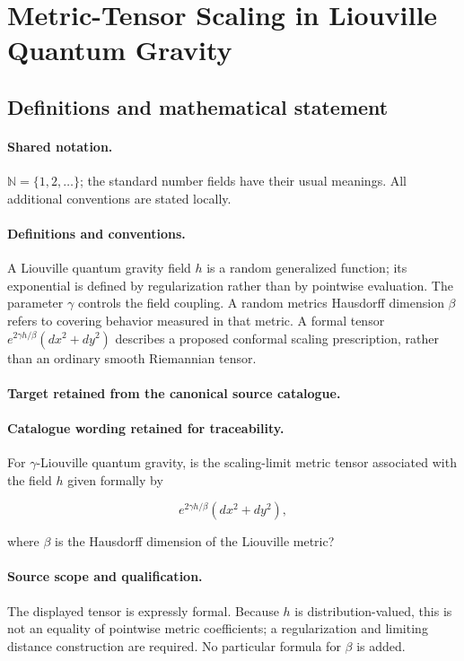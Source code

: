 \documentclass[11pt]{article}
\begin{document}
\section{Metric-Tensor Scaling in Liouville Quantum Gravity}\label{statement}

\subsection{Definitions and mathematical statement}

\paragraph{Shared notation.}$\mathbb N=\{1,2,\ldots\}$; the standard number fields have their usual meanings. All additional conventions are stated locally.


\paragraph{Definitions and conventions.}
A Liouville quantum gravity field $h$ is a random generalized function; its exponential is defined by regularization rather than by pointwise evaluation. The parameter $\gamma$ controls the field coupling. A random metric\textquotesingle s Hausdorff dimension $\beta$ refers to covering behavior measured in that metric. A formal tensor $e^{2\gamma h/\beta}(dx^2+dy^2)$ describes a proposed conformal scaling prescription, rather than an ordinary smooth Riemannian tensor.

\paragraph{Target retained from the canonical source catalogue.}
\paragraph{Catalogue wording retained for traceability.}
For $\gamma$-Liouville quantum gravity, is the scaling-limit metric tensor associated with the field $h$ given formally by

$$e^{2\gamma h/\beta}(dx^2+dy^2),$$

where $\beta$ is the Hausdorff dimension of the Liouville metric?

\paragraph{Source scope and qualification.}
The displayed tensor is expressly formal. Because $h$ is distribution-valued, this is not an equality of pointwise metric coefficients; a regularization and limiting distance construction are required. No particular formula for $\beta$ is added.
\end{document}
